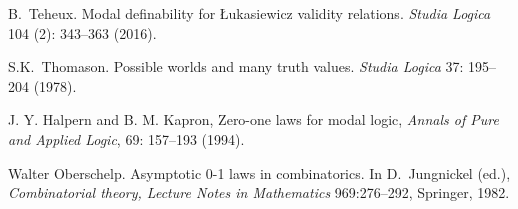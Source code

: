 \documentclass[bsl,meeting]{asl}
\begin{document}
%
\begin{thebibliography}{10}
%
%

B.~Teheux. Modal definability for \L ukasiewicz validity relations. \emph{Studia Logica} 104 (2): 343--363 (2016).

S.K.~Thomason. Possible worlds and many truth values. \emph{Studia Logica} 37: 195--204 (1978).

J. Y. Halpern and B. M. Kapron, Zero-one laws for modal logic,
\emph{Annals of Pure and Applied Logic}, 69: 157–193 (1994).


Walter Oberschelp. Asymptotic 0-1 laws in combinatorics. In D.~Jungnickel (ed.), \emph{Combinatorial theory, Lecture Notes in Mathematics} 969:276--292, Springer, 1982.


\end{thebibliography}


\vspace*{-0.5\baselineskip}
\end{document}
